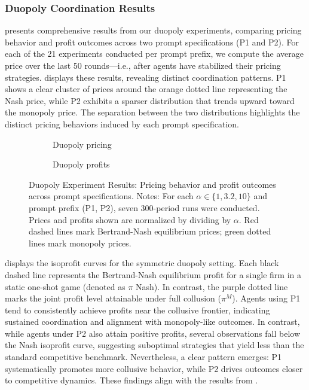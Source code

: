 \subsubsection*{Duopoly Coordination Results}

 presents comprehensive results from our duopoly experiments, comparing pricing behavior and profit outcomes across two prompt specifications (P1 and P2). For each of the 21 experiments conducted per prompt prefix, we compute the average price over the last 50 rounds—i.e., after agents have stabilized their pricing strategies.  displays these results, revealing distinct coordination patterns. P1 shows a clear cluster of prices around the orange dotted line representing the Nash price, while P2 exhibits a sparser distribution that trends upward toward the monopoly price. The separation between the two distributions highlights the distinct pricing behaviors induced by each prompt specification.

\begin{figure}[htpb!]
    \centering
    \begin{subfigure}[b]{0.475\linewidth}
    
    \caption{Duopoly pricing}
    \label{fig:duopoly_1}
    \end{subfigure}
    \hfill
    \begin{subfigure}[b]{0.475\linewidth}
    
    \caption{Duopoly profits}
    \label{fig:duopoly_2}
    \end{subfigure}
    \caption{Duopoly Experiment Results: Pricing behavior and profit outcomes across prompt specifications. Notes: For each $\alpha \in \{1, 3.2, 10\}$ and prompt prefix (P1, P2), seven 300-period runs were conducted. Prices and profits shown are normalized by dividing by $\alpha$. Red dashed lines mark Bertrand-Nash equilibrium prices; green dotted lines mark monopoly prices.}
    \label{fig:duopoly}
\end{figure}

 displays the isoprofit curves for the symmetric duopoly setting. Each black dashed line represents the Bertrand-Nash equilibrium profit for a single firm in a static one-shot game (denoted as $\pi$ Nash). In contrast, the purple dotted line marks the joint profit level attainable under full collusion ($\pi^M$). Agents using P1 tend to consistently achieve profits near the collusive frontier, indicating sustained coordination and alignment with monopoly-like outcomes. In contrast, while agents under P2 also attain positive profits, several observations fall below the Nash isoprofit curve, suggesting suboptimal strategies that yield less than the standard competitive benchmark. Nevertheless, a clear pattern emerges: P1 systematically promotes more collusive behavior, while P2 drives outcomes closer to competitive dynamics. These findings align with the results from \textcite{fish_algorithmic_2025}.

